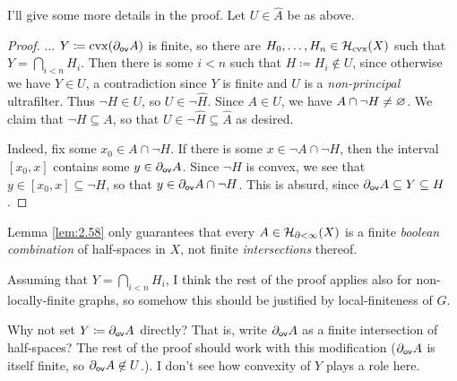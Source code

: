\documentclass{amsart}
\begin{document}
    I'll give some more details in the proof. Let $U\in\widehat{A}$ be as above.

    \begin{proof}
        ... $Y\coloneqq\cvx(\del_\sf{ov}A)$ is finite, so there are $H_0,\dots,H_n\in\mc{H}_\textrm{cvx}(X)$ such that $Y=\bigcap_{i<n}H_i$. Then there is some $i<n$ such that $H\coloneqq H_i\not\in U$, since otherwise we have $Y\in U$, a contradiction since $Y$ is finite and $U$ is a \textit{non-principal} ultrafilter. Thus $\lnot H\in U$, so $U\in\lnot\widehat{H}$. Since $A\in U$, we have $A\cap\lnot H\neq\em$. We claim that $\lnot H\subseteq A$, so that $U\in\lnot\widehat{H}\subseteq\widehat{A}$ as desired.

        Indeed, fix some $x_0\in A\cap\lnot H$. If there is some $x\in\lnot A\cap\lnot H$, then the interval $[x_0,x]$ contains some $y\in\del_\sf{ov}A$. Since $\lnot H$ is convex, we see that $y\in[x_0,x]\subseteq\lnot H$, so that $y\in\del_\sf{ov}A\cap\lnot H$. This is absurd, since $\del_\sf{ov}A\subseteq Y\subseteq H$.
    \end{proof}

    \begin{question}
        Lemma \ref{lem:2.58} only guarantees that every $A\in\mc{H}_{\del<\infty}(X)$ is a finite \textit{boolean combination} of half-spaces in $X$, not finite \textit{intersections} thereof.

        Assuming that $Y=\bigcap_{i<n}H_i$, I think the rest of the proof applies also for non-locally-finite graphs, so somehow this should be justified by local-finiteness of $G$.
    \end{question}

    \begin{question}
        Why not set $Y\coloneqq\del_\sf{ov}A$ directly? That is, write $\del_\sf{ov}A$ as a finite intersection of half-spaces? The rest of the proof should work with this modification ($\del_\sf{ov}A$ is itself finite, so $\del_\sf{ov}A\not\in U$.). I don't see how convexity of $Y$ plays a role here.
    \end{question}

    \begin{question}
        
    \end{question}
\end{document}
